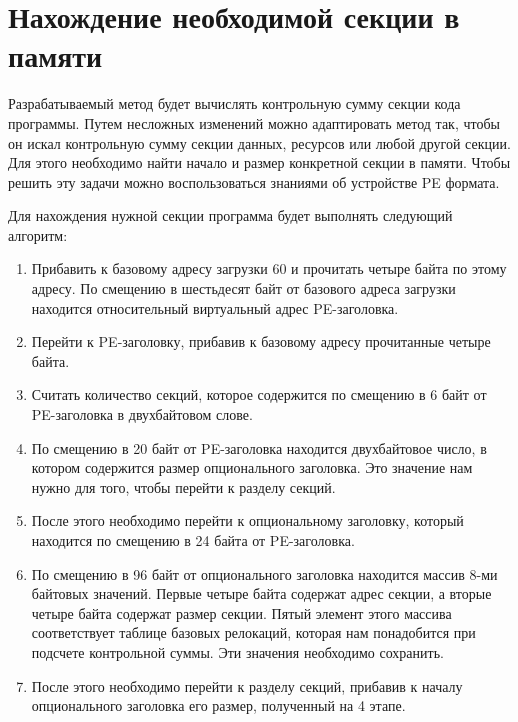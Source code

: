 
\section{Нахождение необходимой секции в памяти}

Разрабатываемый метод будет вычислять контрольную сумму секции кода программы.
Путем несложных изменений можно адаптировать метод так, чтобы он искал
контрольную сумму секции данных, ресурсов или любой другой секции. Для этого
необходимо найти начало и размер конкретной секции в памяти. Чтобы решить эту
задачи можно воспользоваться знаниями об устройстве PE формата. 

Для нахождения нужной секции программа будет выполнять следующий алгоритм:
\begin{enumerate}[label=\arabic*.]
  \item Прибавить к базовому адресу загрузки 60 и прочитать четыре байта по этому
    адресу. По смещению в шестьдесят байт от базового адреса загрузки находится
    относительный виртуальный адрес PE-заголовка.
    
  \item Перейти к PE-заголовку, прибавив к базовому адресу прочитанные четыре
    байта. 

  \item Считать количество секций, которое содержится по смещению в 6 байт от
    PE-заголовка в двухбайтовом слове.

  \item По смещению в 20 байт от PE-заголовка находится двухбайтовое число, в
    котором содержится размер опционального заголовка. Это значение нам нужно
    для того, чтобы перейти к разделу секций.

  \item После этого необходимо перейти к опциональному заголовку, который
    находится по смещению в 24 байта от PE-заголовка. 

  \item По смещению в 96 байт от опционального заголовка находится массив 8-ми
    байтовых значений. Первые четыре байта содержат адрес секции, а вторые
    четыре байта содержат размер секции. Пятый элемент этого массива
    соответствует таблице базовых релокаций, которая нам понадобится при
    подсчете контрольной суммы. Эти значения необходимо сохранить.

  \item После этого необходимо перейти к разделу секций, прибавив к началу
    опционального заголовка его размер, полученный на 4 этапе.


\end{enumerate}
